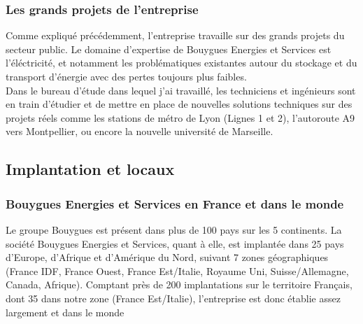 \documentclass[a4paper]{article}
\begin{document}
    \subsubsection{Les grands projets de l'entreprise}

    Comme expliqué précédemment, l'entreprise travaille sur des grands projets du secteur public. Le domaine d'expertise de Bouygues Energies et Services est l'éléctricité, et notamment les problématiques existantes autour du stockage et du transport d'énergie avec des pertes toujours plus faibles. \\

    Dans le bureau d'étude dans lequel j'ai travaillé, les techniciens et ingénieurs sont en train d'étudier et de mettre en place de nouvelles solutions techniques sur des projets réels comme les stations de métro de Lyon (Lignes 1 et 2), l’autoroute A9 vers Montpellier, ou encore la nouvelle université de Marseille. \\

    \subsection{Implantation et locaux}
    \subsubsection{Bouygues Energies et Services en France et dans le monde}

    Le groupe Bouygues est présent dans plus de 100 pays sur les 5 continents. La société Bouygues Energies et Services, quant à elle, est implantée dans 25 pays d’Europe, d’Afrique et d’Amérique du Nord, suivant 7 zones géographiques (France IDF, France Ouest, France Est/Italie, Royaume Uni, Suisse/Allemagne, Canada, Afrique). Comptant près de 200 implantations sur le territoire Français, dont 35 dans notre zone (France Est/Italie), l’entreprise est donc 
    établie assez largement et dans le monde
\end{document}
